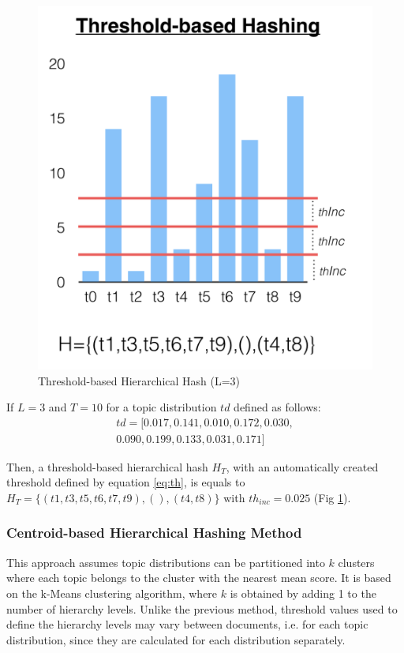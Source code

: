 \begin{figure}[t]\centering
\includegraphics[scale=0.35]{threshold-hash.png}
\caption{Threshold-based Hierarchical Hash (L=3)}
\label{fig:th_hash}
\end{figure}

If $L=3$ and $T=10$ for a topic distribution $td$ defined as follows:
\begin{equation}
    \begin{gathered}
td=[0.017, 0.141, 0.010, 0.172, 0.030, \\
0.090, 0.199,  0.133,  0.031, 0.171]
    \end{gathered}
    \label{eq:sample}
\end{equation}

Then, a threshold-based hierarchical hash $H_{T}$, with an automatically created threshold defined by equation \ref{eq:th}, is equals to $H_{T}=\{(t1,t3,t5,t6,t7,t9),(),(t4,t8)\}$ with $th_{inc}=0.025$ (Fig  \ref{fig:th_hash}).

\subsubsection{Centroid-based Hierarchical Hashing Method}
\label{sec:comparison-centroid}
This approach assumes topic distributions can be partitioned into $k$ clusters where each topic belongs to the cluster with the nearest mean score. It is based on the k-Means clustering algorithm, where $k$ is obtained by adding 1 to the number of hierarchy levels. Unlike the previous method, threshold values used to define the hierarchy levels may vary between documents, i.e. for each topic distribution, since they are calculated for each distribution separately.

